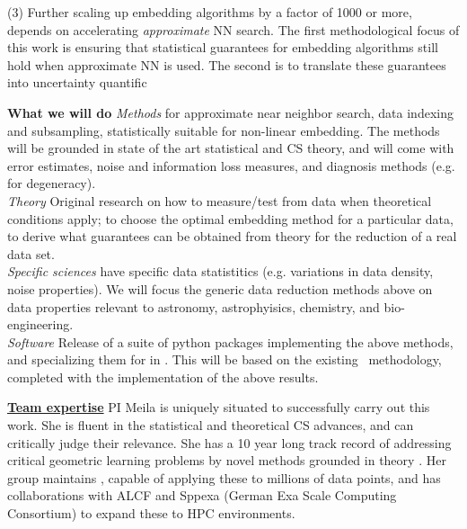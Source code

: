 \documentclass[floatfix,11pt]{article}
\begin{document}
(3) Further scaling up embedding algorithms by a factor of 1000 or more, depends on accelerating {\em approximate} NN search. The first methodological focus of this work is ensuring that statistical guarantees for embedding algorithms still hold when approximate NN is used. The second is to translate these guarantees into uncertainty quantific


\textbf{What we will do}
 {\em Methods} for approximate near neighbor search, data indexing and subsampling, statistically suitable for non-linear embedding. The methods will be grounded in state of the art statistical and CS theory, and will come with error estimates, noise and information loss measures, and diagnosis methods (e.g. for degeneracy).\\
{\em Theory}  Original research on how to measure/test from data when theoretical conditions apply; to choose the optimal embedding method for a particular data, to derive what guarantees can be obtained from theory for the reduction of a real data set.
 \\
{\em Specific sciences} have specific data statistitics (e.g. variations in data density, noise properties). We will focus the generic data reduction methods above on data properties relevant to astronomy, astrophyisics, chemistry, and bio-engineering.\\
{\em Software} Release of a suite of python packages implementing the above methods, and specializing them for  in . This will be based on the existing \mmani~methodology, completed with the implementation of the above results.

\underline{\bf Team expertise} %
PI Meila is uniquely situated to successfully carry out this work. She is fluent in the statistical and theoretical CS advances, and can critically judge their relevance. She has a 10 year long track record of addressing critical geometric learning problems by novel methods grounded in theory \citep{2013arXiv1305.7255P,}. Her group maintains \mmani, capable of applying these to millions of data points, and has collaborations with ALCF and Sppexa (German Exa Scale Computing Consortium) to expand these to HPC environments.
\end{document}

